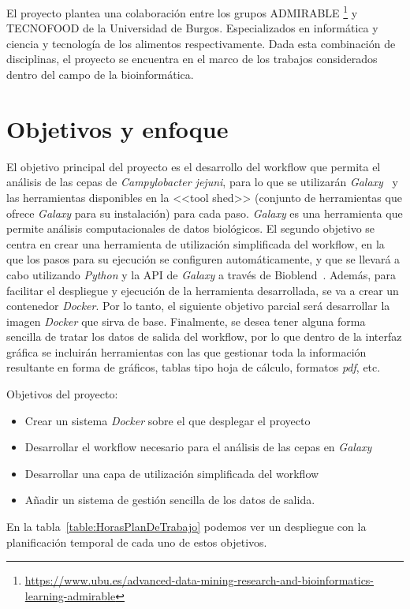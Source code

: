 El proyecto plantea una colaboración entre los grupos ADMIRABLE \footnote{\url{https://www.ubu.es/advanced-data-mining-research-and-bioinformatics-learning-admirable}} y TECNOFOOD de la Universidad de Burgos. Especializados en informática y ciencia y tecnología de los alimentos respectivamente. Dada esta combinación de disciplinas, el proyecto se encuentra en el marco de los trabajos considerados dentro del campo de la bioinformática.


\section{Objetivos y enfoque}
El objetivo principal del proyecto es el desarrollo del workflow que permita el análisis de las cepas de \textit{Campylobacter jejuni}, para lo que se utilizarán \textit{Galaxy}~\cite{afgan2018galaxy} y las herramientas disponibles en la <<tool shed>> (conjunto de herramientas que ofrece \textit{Galaxy} para su instalación) para cada paso. \textit{Galaxy} es una herramienta que permite análisis computacionales de datos biológicos. 
El segundo objetivo se centra en crear una herramienta de utilización simplificada del workflow, en la que los pasos para su ejecución se configuren automáticamente, y que se llevará a cabo utilizando \textit{Python} y la API de \textit{Galaxy} a través de Bioblend~\cite{Sloggett2013}. 
Además, para facilitar el despliegue y ejecución de la herramienta desarrollada, se va a crear un contenedor \textit{Docker}. Por lo tanto, el siguiente objetivo parcial será desarrollar la imagen \textit{Docker} que sirva de base.
Finalmente, se desea tener alguna forma sencilla de tratar los datos de salida del workflow, por lo que dentro de la interfaz gráfica se incluirán herramientas con las que gestionar toda la información resultante en forma de gráficos, tablas tipo hoja de cálculo, formatos \textit{pdf}, etc.

Objetivos del proyecto:
\begin{itemize}
\item Crear un sistema \textit{Docker} sobre el que desplegar el proyecto
\item Desarrollar el workflow necesario para el análisis de las cepas en \textit{Galaxy}
\item Desarrollar una capa de utilización simplificada del workflow
\item Añadir un sistema de gestión sencilla de los datos de salida.
\end{itemize}

En la tabla~\ref{table:HorasPlanDeTrabajo} podemos ver un despliegue con la planificación temporal de cada uno de estos objetivos.

